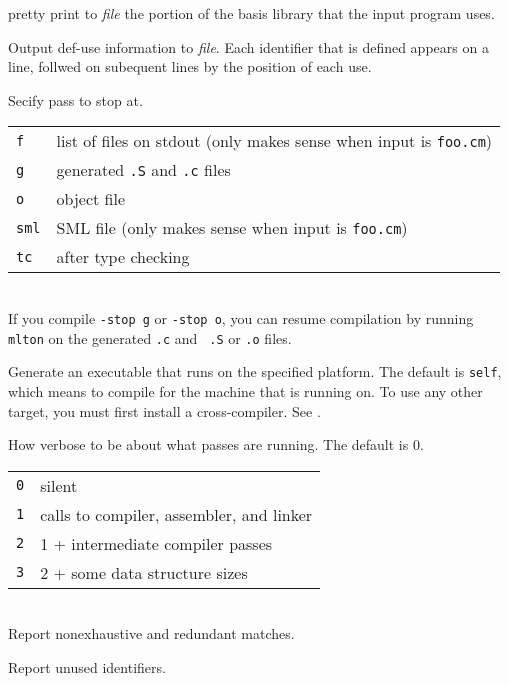 \begin{description}
pretty print to {\it file} the portion of the basis library that the
input program uses.

Output def-use information to {\it file}.  Each identifier that is
defined appears on a line, follwed on subequent lines by the position
of each use.

Secify pass to stop at.\\
\begin{tabular}{l|l}
{\tt f} & list of files on stdout (only makes sense when input is {\tt foo.cm})\\
{\tt g} & generated {\tt .S} and {\tt .c} files\\
{\tt o} & object file\\
{\tt sml} & SML file (only makes sense when input is {\tt foo.cm})\\
{\tt tc} & after type checking\\
\end{tabular}\\
If you compile {\tt -stop g} or {\tt -stop o}, you can resume
compilation by running {\tt mlton} on the generated {\tt .c} and {\tt
.S} or {\tt .o} files. 

Generate an executable that runs on the specified platform.  The default
is {\tt self}, which means to compile for the machine that {\mlton} is
running on.  To use any other target, you must first install a
cross-compiler.  See .

How verbose to be about what passes are running.  The default is 0.\\
\begin{tabular}{l|l}
{\tt 0} & silent\\
{\tt 1} & calls to compiler, assembler, and linker\\
{\tt 2} & 1 + intermediate compiler passes\\
{\tt 3} & 2 + some data structure sizes\\
\end{tabular}\\

Report nonexhaustive and redundant matches.

Report unused identifiers.

\end{description}

